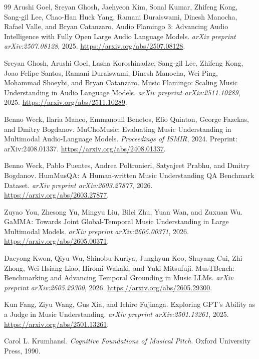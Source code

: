 \documentclass[11pt,a4paper]{article}
\begin{document}
\begin{thebibliography}{99}
Arushi Goel, Sreyan Ghosh, Jaehyeon Kim, Sonal Kumar, Zhifeng Kong, Sang-gil Lee, Chao-Han Huck Yang, Ramani Duraiswami, Dinesh Manocha, Rafael Valle, and Bryan Catanzaro.
\newblock Audio Flamingo 3: Advancing Audio Intelligence with Fully Open Large Audio Language Models.
\newblock \emph{arXiv preprint arXiv:2507.08128}, 2025.
\newblock \url{https://arxiv.org/abs/2507.08128}.

Sreyan Ghosh, Arushi Goel, Lasha Koroshinadze, Sang-gil Lee, Zhifeng Kong, Joao Felipe Santos, Ramani Duraiswami, Dinesh Manocha, Wei Ping, Mohammad Shoeybi, and Bryan Catanzaro.
\newblock Music Flamingo: Scaling Music Understanding in Audio Language Models.
\newblock \emph{arXiv preprint arXiv:2511.10289}, 2025.
\newblock \url{https://arxiv.org/abs/2511.10289}.

Benno Weck, Ilaria Manco, Emmanouil Benetos, Elio Quinton, George Fazekas, and Dmitry Bogdanov.
\newblock MuChoMusic: Evaluating Music Understanding in Multimodal Audio-Language Models.
\newblock \emph{Proceedings of ISMIR}, 2024. Preprint: arXiv:2408.01337.
\newblock \url{https://arxiv.org/abs/2408.01337}.

Benno Weck, Pablo Puentes, Andrea Poltronieri, Satyajeet Prabhu, and Dmitry Bogdanov.
\newblock HumMusQA: A Human-written Music Understanding QA Benchmark Dataset.
\newblock \emph{arXiv preprint arXiv:2603.27877}, 2026.
\newblock \url{https://arxiv.org/abs/2603.27877}.

Zuyao You, Zhesong Yu, Mingyu Liu, Bilei Zhu, Yuan Wan, and Zuxuan Wu.
\newblock GaMMA: Towards Joint Global-Temporal Music Understanding in Large Multimodal Models.
\newblock \emph{arXiv preprint arXiv:2605.00371}, 2026.
\newblock \url{https://arxiv.org/abs/2605.00371}.

Daeyong Kwon, Qiyu Wu, Shinobu Kuriya, Junghyun Koo, Shuyang Cui, Zhi Zhong, Wei-Hsiang Liao, Hiromi Wakaki, and Yuki Mitsufuji.
\newblock MusTBench: Benchmarking and Advancing Temporal Grounding in Music LLMs.
\newblock \emph{arXiv preprint arXiv:2605.29300}, 2026.
\newblock \url{https://arxiv.org/abs/2605.29300}.

Kun Fang, Ziyu Wang, Gus Xia, and Ichiro Fujinaga.
\newblock Exploring GPT's Ability as a Judge in Music Understanding.
\newblock \emph{arXiv preprint arXiv:2501.13261}, 2025.
\newblock \url{https://arxiv.org/abs/2501.13261}.

Carol L. Krumhansl.
\newblock \emph{Cognitive Foundations of Musical Pitch}.
\newblock Oxford University Press, 1990.
\end{thebibliography}
\end{document}

